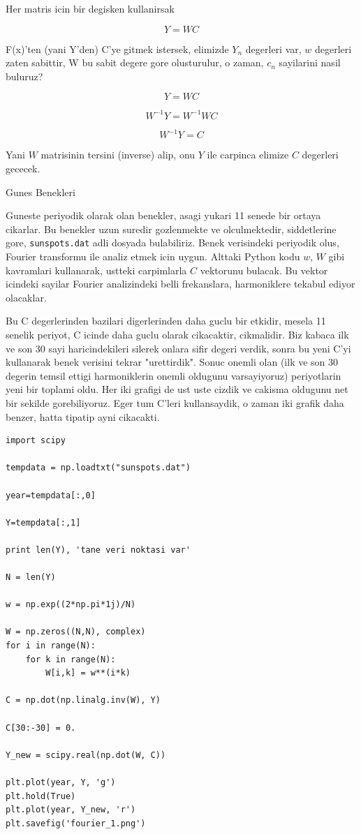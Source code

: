 \documentclass[12pt,fleqn]{article}\usepackage{../common}
\begin{document}
Her matris icin bir degisken kullanirsak

$$ Y = WC $$

F(x)'ten (yani Y'den) C'ye gitmek istersek, elimizde $Y_n$ degerleri var, $w$
degerleri zaten sabittir, W bu sabit degere gore olusturulur, o zaman, $c_n$
sayilarini nasil buluruz?

$$ Y = WC  $$

$$ W^{-1}Y = W^{-1}WC  $$

$$ W^{-1}Y = C $$

Yani $W$ matrisinin tersini (inverse) alip, onu $Y$ ile carpinca elimize $C$
degerleri gececek. 

Gunes Benekleri

Guneste periyodik olarak olan benekler, asagi yukari 11 senede bir ortaya
cikarlar. Bu benekler uzun suredir gozlenmekte ve olculmektedir,
siddetlerine gore, \verb!sunspots.dat! adli dosyada bulabiliriz. Benek
verisindeki periyodik olus, Fourier transformu ile analiz etmek icin
uygun. Alttaki Python kodu $w$, $W$ gibi kavramlari kullanarak, ustteki
carpimlarla $C$ vektorunu bulacak. Bu vektor icindeki sayilar Fourier
analizindeki belli frekanslara, harmoniklere tekabul ediyor olacaklar.

Bu C degerlerinden bazilari digerlerinden daha guclu bir etkidir, mesela 11
senelik periyot, C icinde daha guclu olarak cikacaktir, cikmalidir. Biz kabaca
ilk ve son 30 sayi haricindekileri silerek onlara sifir degeri verdik, sonra bu
yeni C'yi kullanarak benek verisini tekrar "urettirdik". Sonuc onemli olan
(ilk ve son 30 degerin temsil ettigi harmoniklerin onemli oldugunu varsayiyoruz)
periyotlarin yeni bir toplami oldu. Her iki grafigi de ust uste cizdik ve
cakisma oldugunu net bir sekilde gorebiliyoruz. Eger tum C'leri kullansaydik, o
zaman iki grafik daha benzer, hatta tipatip ayni cikacakti.

\begin{verbatim}
import scipy

tempdata = np.loadtxt("sunspots.dat")

year=tempdata[:,0]

Y=tempdata[:,1]

print len(Y), 'tane veri noktasi var'

N = len(Y)

w = np.exp((2*np.pi*1j)/N)

W = np.zeros((N,N), complex)
for i in range(N):
    for k in range(N):
        W[i,k] = w**(i*k)
        
C = np.dot(np.linalg.inv(W), Y) 

C[30:-30] = 0.

Y_new = scipy.real(np.dot(W, C))

plt.plot(year, Y, 'g')
plt.hold(True)
plt.plot(year, Y_new, 'r')
plt.savefig('fourier_1.png')
\end{verbatim}
\end{document}
